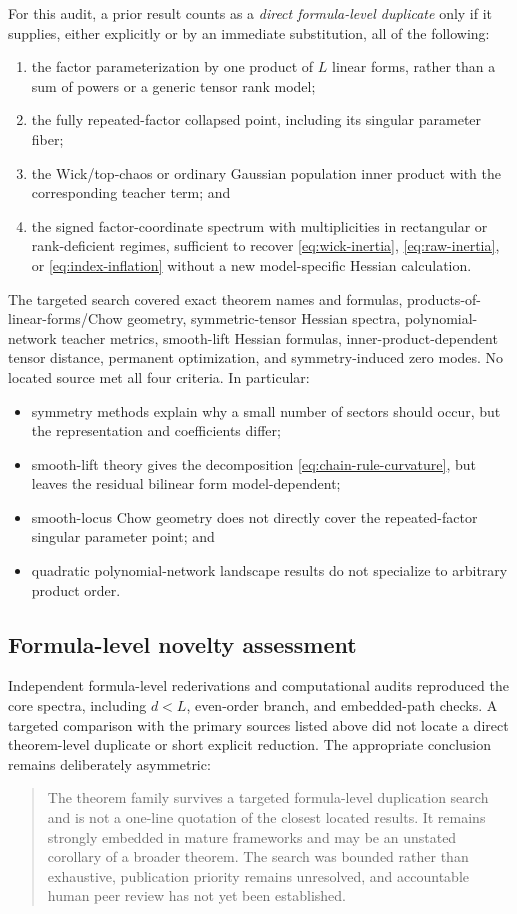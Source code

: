 \documentclass[11pt]{article}
\begin{document}
For this audit, a prior result counts as a \emph{direct formula-level duplicate} only if it supplies, either explicitly or by an immediate substitution, all of the following:
\begin{enumerate}[label=(D\arabic*)]
\item the factor parameterization by one product of $L$ linear forms, rather than a sum of powers or a generic tensor rank model;
\item the fully repeated-factor collapsed point, including its singular parameter fiber;
\item the Wick/top-chaos or ordinary Gaussian population inner product with the corresponding teacher term; and
\item the signed factor-coordinate spectrum with multiplicities in rectangular or rank-deficient regimes, sufficient to recover \eqref{eq:wick-inertia}, \eqref{eq:raw-inertia}, or \eqref{eq:index-inflation} without a new model-specific Hessian calculation.
\end{enumerate}

The targeted search covered exact theorem names and formulas, products-of-linear-forms/Chow geometry, symmetric-tensor Hessian spectra, polynomial-network teacher metrics, smooth-lift Hessian formulas, inner-product-dependent tensor distance, permanent optimization, and symmetry-induced zero modes.  No located source met all four criteria.  In particular:
\begin{itemize}
\item symmetry methods explain why a small number of sectors should occur, but the representation and coefficients differ;
\item smooth-lift theory gives the decomposition \eqref{eq:chain-rule-curvature}, but leaves the residual bilinear form model-dependent;
\item smooth-locus Chow geometry does not directly cover the repeated-factor singular parameter point; and
\item quadratic polynomial-network landscape results do not specialize to arbitrary product order.
\end{itemize}

\subsection{Formula-level novelty assessment}

Independent formula-level rederivations and computational audits reproduced the core spectra, including $d<L$, even-order branch, and embedded-path checks.  A targeted comparison with the primary sources listed above did not locate a direct theorem-level duplicate or short explicit reduction.  The appropriate conclusion remains deliberately asymmetric:
\begin{quote}
The theorem family survives a targeted formula-level duplication search and is not a one-line quotation of the closest located results.  It remains strongly embedded in mature frameworks and may be an unstated corollary of a broader theorem.  The search was bounded rather than exhaustive, publication priority remains unresolved, and accountable human peer review has not yet been established.
\end{quote}
\end{document}
